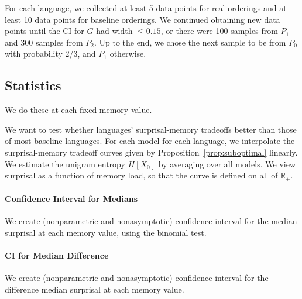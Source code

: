 \documentclass[11pt,letterpaper]{article}
\begin{document}
For each language, we collected at least 5 data points for real orderings and at least 10 data points for baseline orderings.
We continued obtaining new data points until the CI for $G$ had width $\leq 0.15$, or there were 100 samples from $P_1$ and 300 samples from $P_2$.
Up to the end, we chose the next sample to be from $P_0$ with probability 2/3, and $P_1$ otherwise.

%



%
%


\subsection{Statistics}

We do these at each fixed memory value.

We want to test whether languages' surprisal-memory tradeoffs better than those of most baseline languages.
For each model for each language, we interpolate the surprisal-memory tradeoff curves given by Proposition~\ref{prop:suboptimal} linearly.
We estimate the unigram entropy $H[X_0]$ by averaging over all models.
We view surprisal as a function of memory load, so that the curve is defined on all of $\mathbb{R}_+$.



\paragraph{Confidence Interval for Medians}
We create (nonparametric and nonasymptotic) confidence interval for the median surprisal at each memory value, using the binomial test.



\paragraph{CI for Median Difference}
We create (nonparametric and nonasymptotic) confidence interval for the difference median surprisal at each memory value.
\end{document}
